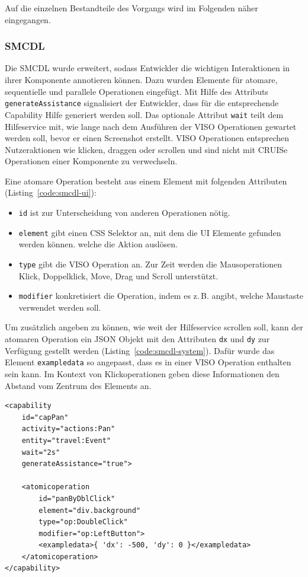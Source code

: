 \documentclass[
	headsepline,
	footsepline,
	fontsize=12pt,
	bibliography=totoc
]{scrbook}
\begin{document}
Auf die einzelnen Bestandteile des Vorgangs wird im Folgenden näher eingegangen.

\subsubsection{SMCDL}

Die SMCDL wurde erweitert, sodass Entwickler die wichtigen Interaktionen in ihrer Komponente annotieren können. Dazu wurden Elemente für atomare, sequentielle und parallele Operationen eingefügt. Mit Hilfe des Attributs \texttt{generateAssistance} signalisiert der Entwickler, dass für die entsprechende Capability Hilfe generiert werden soll. Das optionale Attribut \texttt{wait} teilt dem Hilfeservice mit, wie lange nach dem Ausführen der VISO Operationen gewartet werden soll, bevor er einen Screenshot erstellt. VISO Operationen entsprechen Nutzeraktionen wie klicken, draggen oder scrollen und sind nicht mit CRUISe Operationen einer Komponente zu verwechseln.

Eine atomare Operation besteht aus einem Element mit folgenden Attributen (Listing~\ref{code:smcdl-ui}):

\begin{itemize}
	\item \texttt{id} ist zur Unterscheidung von anderen Operationen nötig.
	\item \texttt{element} gibt einen CSS Selektor an, mit dem die UI Elemente gefunden werden können. welche die Aktion auslösen.
	\item \texttt{type} gibt die VISO Operation an. Zur Zeit werden die Mausoperationen Klick, Doppelklick, Move, Drag und Scroll unterstützt.
	\item \texttt{modifier} konkretisiert die Operation, indem es z.\,B. angibt, welche Maustaste verwendet werden soll.
\end{itemize}

Um zusätzlich angeben zu können, wie weit der Hilfeservice scrollen soll, kann der atomaren Operation ein JSON Objekt mit den Attributen \texttt{dx} und \texttt{dy} zur Verfügung gestellt werden (Listing~\ref{code:smcdl-system}). Dafür wurde das Element \texttt{exampledata} so angepasst, dass es in einer VISO Operation enthalten sein kann. Im Kontext von Klickoperationen geben diese Informationen den Abstand vom Zentrum des Elements an.

\lstset{language=XML}
\begin{lstlisting}[caption={SMCDL für UI Capability}, label=code:smcdl-ui]
<capability
	id="capPan"
	activity="actions:Pan"
	entity="travel:Event"
	wait="2s"
	generateAssistance="true">
	
	<atomicoperation
		id="panByDblClick"
		element="div.background"
		type="op:DoubleClick"
		modifier="op:LeftButton">
		<exampledata>{ 'dx': -500, 'dy': 0 }</exampledata>
	</atomicoperation>
</capability>
\end{lstlisting}
\end{document}
